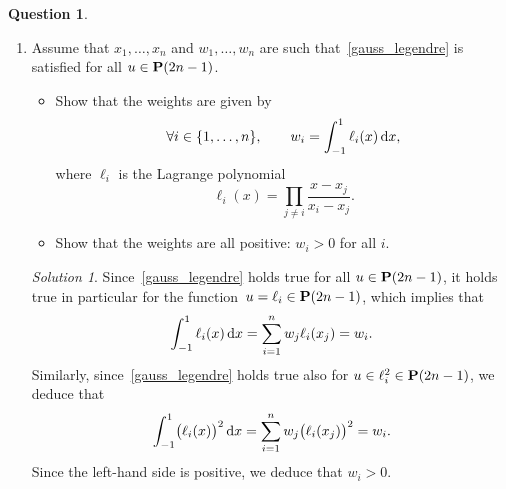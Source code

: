 \documentclass[11pt]{article}
\theoremstyle{definition}
\newtheorem{question}{Question}
\theoremstyle{remark}
\newtheorem*{protosolution}{Solution}
\newenvironment{solutionframe}
{%
    \begin{mdframed}[
        leftmargin=1cm,
        skipabove=.3cm,
        linecolor=blue,
        backgroundcolor=lightgreen,
        linewidth=0pt,
        innerleftmargin=.5em,
        innerrightmargin=.5em,
        innertopmargin=.3em,
        innerbottommargin=.6em,
    ]
}
{
    \end{mdframed}
}
\newenvironment{solution}
{\pushQED{\qed}\renewcommand{\qedsymbol}{$\triangle$}
\begin{solutionframe}\small \begin{protosolution}}
{\popQED\end{protosolution}\end{solutionframe}}
\begin{document}
\begin{question}
\begin{enumerate}
        \item
            Assume that $x_1, \dotsc, x_n$ and $w_1, \dotsc, w_n$ are such that~\eqref{gauss_legendre} is satisfied for all $u \in \mathbf P(2n-1)$.
            \begin{itemize}

                \item
                    Show that the weights are given by
                    \[
                        \forall i \in \{1, \dotsc, n\}, \qquad
                        w_i = \int_{-1}^{1} \ell_i(x) \, \mathrm d x,
                    \]
                    where $\ell_i$ is the Lagrange polynomial
                    \[
                        \ell_i(x) = \prod_{j \neq i} \frac{x - x_j}{x_i - x_j}.
                    \]

                \item
                    Show that the weights are all positive: $w_i > 0$ for all $i$.
            \end{itemize}
            \begin{solution}
                Since~\eqref{gauss_legendre} holds true for all $u \in \mathbf P(2n-1)$,
                it holds true in particular for the function~$u = \ell_i \in \mathbf P(2n-1)$,
                which implies that
                \[
                    \int_{-1}^{1} \ell_i(x) \, \mathrm d x = \sum_{i=1}^{n} w_j \ell_i(x_j) = w_i.
                \]
                Similarly, since~\eqref{gauss_legendre} holds true also for $u \in \ell_i^2 \in \mathbf P(2n-1)$,
                we deduce that
                \[
                    \int_{-1}^{1} \bigl(\ell_i(x)\bigr)^2 \, \mathrm d x
                    = \sum_{i=1}^{n} w_j \bigl(\ell_i(x_j)\bigr)^2 = w_i.
                \]
                Since the left-hand side is positive,
                we deduce that $w_i > 0$.
            \end{solution}


\end{enumerate}
\end{question}
\end{document}

